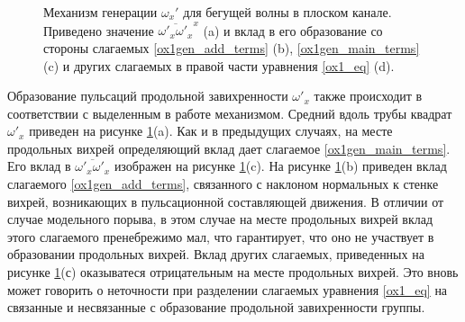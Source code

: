 \begin{figure}
\caption{Механизм генерации $\omega_x'$ для бегущей волны в плоском канале. Приведено значение $\overline{\omega'_x \omega'_x}^x$ (a) и вклад в его образование со стороны слагаемых \eqref{ox1gen_add_terms} (b), \eqref{ox1gen_main_terms} (c) и других слагаемых в правой части уравнения \eqref{ox1_eq} (d).}
\label{duct_turb_tw_ox1gen_pic}
\end{figure}

Образование пульсаций продольной завихренности $\omega'_x$ также происходит в соответствии с выделенным в работе механизмом. Средний вдоль трубы квадрат $\omega'_x$ приведен на рисунке \ref{duct_turb_tw_ox1gen_pic}(a). Как и в предыдущих случаях, на месте продольных вихрей определяющий вклад дает слагаемое \eqref{ox1gen_main_terms}. Его вклад в $\overline{\omega'_x \omega'_x}$ изображен на рисунке  \ref{duct_turb_tw_ox1gen_pic}(c). На рисунке \ref{duct_turb_tw_ox1gen_pic}(b) приведен вклад слагаемого \eqref{ox1gen_add_terms}, связанного с наклоном нормальных к стенке вихрей, возникающих в пульсационной составляющей движения. В отличии от случае модельного порыва, в этом случае на месте продольных вихрей вклад этого слагаемого пренебрежимо мал, что гарантирует, что оно не участвует в образовании продольных вихрей. Вклад других слагаемых, приведенных на рисунке \ref{duct_turb_tw_ox1gen_pic}(с) оказыватеся отрицательным на месте продольных вихрей. Это вновь может говорить о неточности при разделении слагаемых уравнения \eqref{ox1_eq} на связанные и несвязанные с образование продольной завихренности группы.



